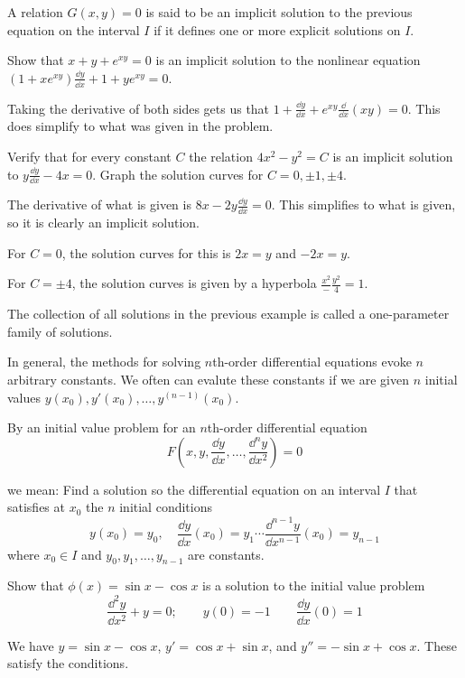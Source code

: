 \documentclass[../diffeq.tex]{subfiles}
\begin{document}
A relation $G(x,y) =0$ is said to be an implicit solution to the previous equation on the interval $I$ if it defines one or more explicit solutions on $I$.

\begin{example}
    Show that $x+y+e^{xy}=0$ is an implicit solution to the nonlinear equation $(1+xe^{xy})\frac{\dd y}{\dd x}+1+ye^{xy}=0$. 

    Taking the derivative of both sides gets us that $1+\frac{\dd y}{\dd x}+e^{xy}\frac{\dd}{\dd x}(xy) =0$. This does simplify to what was given in the problem.
\end{example}

\begin{example}
    Verify that for every constant $C$ the relation $4x^2-y^2=C$ is an implicit solution to $y\frac{\dd y}{\dd x}-4x=0$. Graph the solution curves for $C=0,\pm 1,\pm 4$.

    The derivative of what is given is $8x-2y\frac{\dd y}{\dd x}=0$. This simplifies to what is given, so it is clearly an implicit solution. 

    For $C=0$, the solution curves for this is $2x=y$ and $-2x=y$.

    For $C=\pm 4$, the solution curves is given by a hyperbola $\frac{x^2}-\frac{y^2}{4}=1$. 
\end{example}

The collection of all solutions in the previous example is called a one-parameter family of solutions.

In general, the methods for solving $n$th-order differential equations evoke $n$ arbitrary constants. We often can evalute these constants 
if we are given $n$ initial values $y(x_0), y'(x_0),\dots, y^{(n-1)}(x_0)$.

\begin{definition}
    By an initial value problem for an $n$th-order differential equation 
    \[ F(x,y,\frac{\dd y}{\dd x},\dots,\frac{\dd^n y}{\dd x^2}) =0 \]

    we mean: Find a solution so the differential equation on an interval $I$ that satisfies at $x_0$ the $n$ initial conditions
    \[ y(x_0)=y_0, \quad \frac{\dd y}{\dd x}(x_0)=y_1 \cdots \frac{\dd^{n-1}y}{\dd x^{n-1}}(x_0)=y_{n-1}\]
    where $x_0\in I$ and $y_0, y_1, \dots, y_{n-1}$ are constants.
\end{definition}

\begin{example}
    Show that $\phi(x)=\sin x-\cos x$ is a solution to the initial value problem 
    \[ \frac{\dd^2 y}{\dd x^2}+y = 0; \qquad y(0)=-1 \qquad \frac{\dd y}{\dd x}(0)=1 \]

    We have $y=\sin x-\cos x$, $y'=\cos x+\sin x$, and $y'' = -\sin x+\cos x$. These satisfy the conditions.
\end{example}
\end{document}
